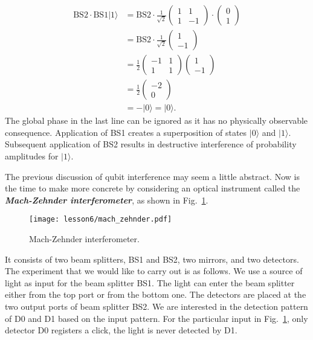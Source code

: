 \begin{align}
    \text{BS}2 \cdot \text{BS}1 |1\rangle & = \text{BS}2 \cdot \frac{1}{\sqrt{2}} \begin{pmatrix} 1 & 1 \\ 1 & -1 \end{pmatrix} \cdot \begin{pmatrix} 0 \\ 1 \end{pmatrix} \nonumber\\
    & = \text{BS}2 \cdot \frac{1}{\sqrt{2}} \begin{pmatrix} 1 \\ -1 \end{pmatrix} \nonumber\\
    & = \frac{1}{2} \begin{pmatrix} -1 & 1 \\ 1 & 1 \end{pmatrix} \begin{pmatrix} 1 \\ -1 \end{pmatrix} \nonumber\\
    & = \frac{1}{2} \begin{pmatrix} -2 \\ 0 \end{pmatrix} \nonumber\\
    & = -|0\rangle = |0\rangle.
    \label{eq:BS2-BS1}
\end{align}
The global phase in the last line can be ignored as it has no physically observable consequence.
Application of BS1 creates a superposition of states $|0\rangle$ and $|1\rangle$.
Subsequent application of BS2 results in destructive interference of probability amplitudes for $|1\rangle$.

The previous discussion of qubit interference may seem a little abstract.
Now is the time to make more concrete by considering an optical instrument called the \textbf{\emph{Mach-Zehnder interferometer}}, as shown in Fig.~\ref{fig:mach-zehnder}.
\begin{figure}[t]
   \centering
    \texttt{[image: lesson6/mach\_zehnder.pdf]}
    \caption{Mach-Zehnder interferometer.}
    \label{fig:mach-zehnder}  
\end{figure}
It consists of two beam splitters, BS1 and BS2, two mirrors, and two detectors.
The experiment that we would like to carry out is as follows.
We use a source of light as input for the beam splitter BS1.
The light can enter the beam splitter either from the top port or from the bottom one.
The detectors are placed at the two output ports of beam splitter BS2.
We are interested in the detection pattern of D0 and D1 based on the input pattern.
For the particular input in Fig.~\ref{fig:mach-zehnder}, only detector D0 registers a click, the light is never detected by D1.

